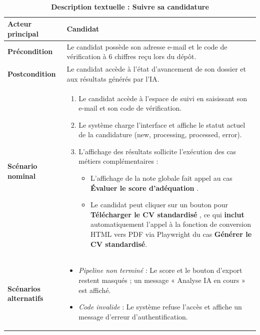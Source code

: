 \documentclass[12pt,a4paper,oneside]{report}
\begin{document}
\begin{itemize}
\begin{table}[H]
\end{table}

\begin{table}[H]
\centering
\caption{\textbf{Description textuelle : Suivre sa candidature}} \\
\vspace{0.3cm}
\begin{tabular}{|p{3.5cm}|p{11cm}|}
\hline
\textbf{Acteur principal} & Candidat \\
\hline
\textbf{Précondition} & Le candidat possède son adresse e-mail et le code de vérification à 6 chiffres reçu lors du dépôt. \\
\hline
\textbf{Postcondition} & Le candidat accède à l'état d'avancement de son dossier et aux résultats générés par l'IA. \\
\hline
\textbf{Scénario nominal} &
\begin{minipage}[t]{10.5cm}
\begin{enumerate}
    \item Le candidat accède à l'espace de suivi en saisissant son e-mail et son code de vérification.
    \item Le système charge l'interface et affiche le statut actuel de la candidature (new, processing, processed, error).
    \item L'affichage des résultats sollicite l'exécution des cas métiers complémentaires :
        \begin{itemize}
            \item L'affichage de la note globale fait appel au cas \textbf{Évaluer le score d'adéquation} .
            \item Le candidat peut cliquer sur un bouton pour \textbf{Télécharger le CV standardisé} , ce qui \textbf{inclut} automatiquement l'appel à la fonction de conversion HTML vers PDF via Playwright du cas \textbf{Générer le CV standardisé}.
        \end{itemize}
        \vspace{0.3cm}

\end{enumerate}
\end{minipage} \\
\hline
\textbf{Scénarios alternatifs} &
\begin{minipage}[t]{10.5cm}
\begin{itemize}
    \item \textit{Pipeline non terminé} : Le score et le bouton d'export restent masqués ; un message « Analyse IA en cours » est affiché.
    \item \textit{Code invalide} : Le système refuse l'accès et affiche un message d'erreur d'authentification.
\end{itemize}
\vspace{0.3cm}


\end{minipage}
\end{tabular}
\end{table}
\end{itemize}
\end{document}
